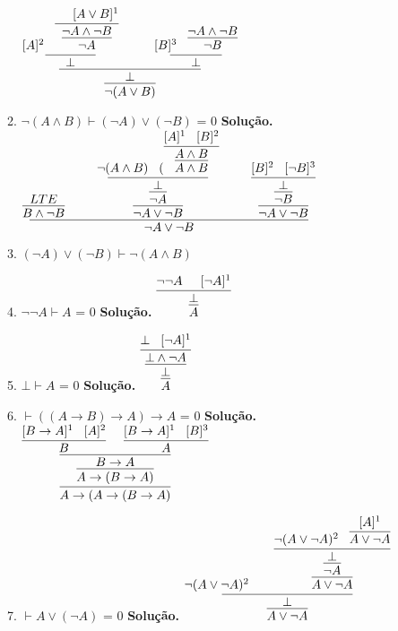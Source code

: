 \documentclass[a4paper]{article}
\newcommand{\answer}[2]{\ifnum#1= 0  {\color{blue} #2}\else \fi}
\begin{document}
\begin{enumerate}
\begin{enumerate}
{    $\infer{\neg{}(A \lor B)}{\infer{\bot}{\infer{\bot}{[A]^2 \hspace{3mm} \infer{\neg{}A}{\infer{\neg{}A \land \neg{}B}{\hspace{5mm} [A \lor B]^1}}} \hspace{10mm} \infer{\bot}{[B]^3 \hspace{3mm} \infer{\neg{}B}{\neg{}A \land \neg{}B}}}}$
    }
\item $\neg(A \land B) \vdash (\neg A) \lor (\neg B)$ \newline
	\answer{0}{
    {\bf Solução.} \newline
    $\infer{\neg{}A \lor \neg{}B}{\infer{B \land \neg{}B}{LTE} \hspace{9mm}\infer{\neg{}A \lor \neg{}B}{\infer{\neg{}A}{\infer{\bot}{\neg{}(A \land B) \hspace{3mm} (\infer{A \land B}{\infer{A \land B}{[A]^1 \hspace{3mm} [B]^2}}}}} \hspace{9mm} \infer{\neg{}A \lor \neg{}B}{\infer{\neg{}B}{\infer{\bot}{[B]^2 \hspace{3mm} [\neg{}B]^3}}}}$
    }
\item $(\neg A) \lor (\neg B) \vdash \neg(A \land B)$
\item $\neg\neg A \vdash A$ \newline
	\answer{0}{
    {\bf Solução.} \newline
    $\infer{A}{\infer{\bot}{\neg{}\neg{}A \hspace{5mm} [\neg{}A]^1}}$ \newline
    }
\item $\bot \vdash A$ \newline
	\answer{0}{
    {\bf Solução.} \newline
    $\infer{A}{\infer{\bot}{\infer{\bot \land \neg{}A}{\bot \hspace{3mm} [\neg{}A]^1}}}$ \newline
    }
\item $\vdash ((A \to B) \to A) \to A$ \newline
	\answer{0}{
    {\bf Solução.} \newline
    $\infer{A \to (A \to ( B \to A) }{\infer{A \to ( B \to A)}{\infer{B \to A}{\infer{B}{[B \to A]^1 \hspace{3mm} [A]^2} \hspace{5mm}\infer{A}{[B \to A]^1 \hspace{3mm} [B]^3}}}}$
    }
\item $\vdash A \lor (\neg A)$ \newline
	\answer{0}{
    {\bf Solução.} \newline
    $\infer{A \lor \neg{}A}{\infer{\bot}{\neg(A \lor \neg{}A)^2 \hspace{7mm} \infer{A \lor \neg{}A}{\infer{\neg{}A}{\infer{\bot}{\neg{}(A \lor \neg{}A)^2 \hspace{3mm} \infer{A \lor \neg{}A}{[A]^1}}}}}}$ \newline
    }
\end{enumerate}



\end{enumerate}
\end{document}
